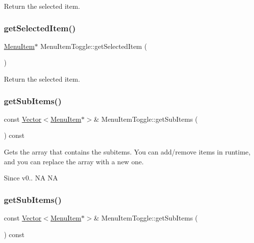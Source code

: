 Return the selected item. \mbox{\label{classMenuItemToggle_a55964c936964441a49e0d2011f26b64a}} 
\subsubsection{\texorpdfstring{get\+Selected\+Item()}{getSelectedItem()}\hspace{0.1cm}{\footnotesize\ttfamily [2/2]}}
{\footnotesize\ttfamily \hyperlink{classMenuItem}{Menu\+Item}$\ast$ Menu\+Item\+Toggle\+::get\+Selected\+Item (\begin{DoxyParamCaption}{ }\end{DoxyParamCaption})}

Return the selected item. \mbox{\label{classMenuItemToggle_a4c88c2253e670a50f8d4eef511ed51fd}} 
\subsubsection{\texorpdfstring{get\+Sub\+Items()}{getSubItems()}\hspace{0.1cm}{\footnotesize\ttfamily [1/2]}}
{\footnotesize\ttfamily const \hyperlink{classVector}{Vector}$<$\hyperlink{classMenuItem}{Menu\+Item}$\ast$$>$\& Menu\+Item\+Toggle\+::get\+Sub\+Items (\begin{DoxyParamCaption}{ }\end{DoxyParamCaption}) const\hspace{0.3cm}{\ttfamily [inline]}}

Gets the array that contains the subitems. You can add/remove items in runtime, and you can replace the array with a new one. \begin{DoxySince}{Since}
v0..  NA  NA 
\end{DoxySince}
\mbox{\label{classMenuItemToggle_a4c88c2253e670a50f8d4eef511ed51fd}} 
\subsubsection{\texorpdfstring{get\+Sub\+Items()}{getSubItems()}\hspace{0.1cm}{\footnotesize\ttfamily [2/2]}}
{\footnotesize\ttfamily const \hyperlink{classVector}{Vector}$<$\hyperlink{classMenuItem}{Menu\+Item}$\ast$$>$\& Menu\+Item\+Toggle\+::get\+Sub\+Items (\begin{DoxyParamCaption}{ }\end{DoxyParamCaption}) const\hspace{0.3cm}{\ttfamily [inline]}}

